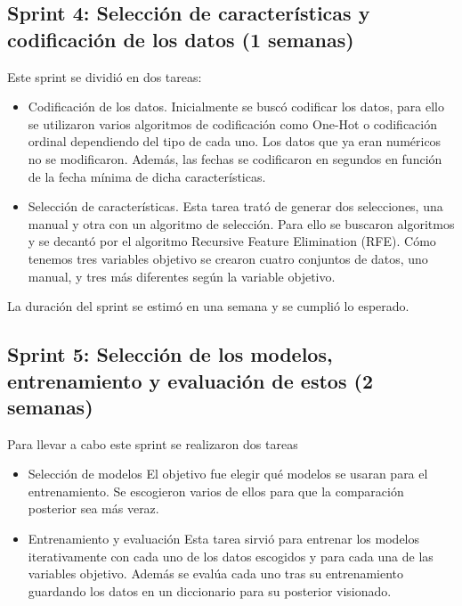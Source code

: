 \subsection{Sprint 4: Selección de características y codificación de los datos (1 semanas)}
Este sprint se dividió en dos tareas:
\begin{itemize}
\item 
    Codificación de los datos.
    Inicialmente se buscó codificar los datos, para ello se utilizaron varios algoritmos de codificación como One-Hot o codificación ordinal dependiendo del tipo de cada uno. Los datos que ya eran numéricos no se modificaron. Además, las fechas se codificaron en segundos en función de la fecha mínima de dicha características.
    \item 
    Selección de características.
    Esta tarea trató de generar dos selecciones, una manual y otra con un algoritmo de selección. Para ello se buscaron algoritmos y se decantó por el algoritmo Recursive Feature Elimination (RFE). Cómo tenemos tres variables objetivo se crearon cuatro conjuntos de datos, uno manual, y tres más diferentes según la variable objetivo.
\end{itemize}
La duración del sprint se estimó en una semana y se cumplió lo esperado.

\subsection{Sprint 5: Selección de los modelos, entrenamiento y evaluación de estos (2 semanas)}
Para llevar a cabo este sprint se realizaron dos tareas
\begin{itemize}
    \item Selección de modelos
    El objetivo fue elegir qué modelos se usaran para el entrenamiento. Se escogieron varios de ellos para que la comparación posterior sea más veraz.
    \item Entrenamiento y evaluación
    Esta tarea sirvió para entrenar los modelos iterativamente con cada uno de los datos escogidos y para cada una de las variables objetivo. Además se evalúa cada uno tras su entrenamiento guardando los datos en un diccionario para su posterior visionado.
\end{itemize}


